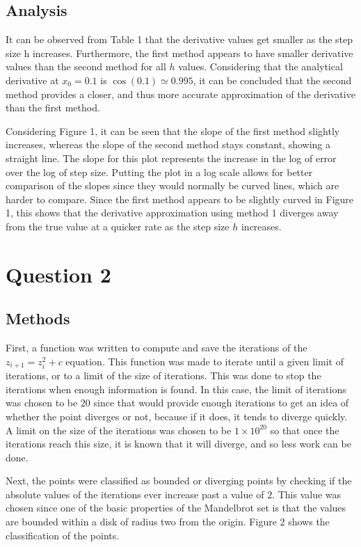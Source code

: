 \documentclass[12pt]{article}
\begin{document}
\subsection{Analysis}
It can be observed from Table 1 that the derivative values get smaller as the step size h increases. Furthermore, the first method appears to have smaller derivative values than the second method for all $h$ values. Considering that the analytical derivative at $x_0 = 0.1$ is $\cos(0.1) \simeq 0.995$, it can be concluded that the second method provides a closer, and thus more accurate approximation of the derivative than the first method.

Considering Figure 1, it can be seen that the slope of the first method slightly increases, whereas the slope of the second method stays constant, showing a straight line. The slope for this plot represents the increase in the log of error over the log of step size. Putting the plot in a log scale allows for better comparison of the slopes since they would normally be curved lines, which are harder to compare. Since the first method appears to be slightly curved in Figure 1, this shows that the derivative approximation using method 1 diverges away from the true value at a quicker rate as the step size $h$ increases.
\section{Question 2}
\subsection{Methods}
First, a function was written to compute and save the iterations of the $z_{i+1} = z_i^2 + c$ equation. This function was made to iterate until a given limit of iterations, or to a limit of the size of iterations. This was done to stop the iterations when enough information is found. In this case, the limit of iterations was chosen to be $20$ since that would provide enough iterations to get an idea of whether the point diverges or not, because if it does, it tends to diverge quickly. A limit on the size of the iterations was chosen to be $1 \times 10^{20}$ so that once the iterations reach this size, it is known that it will diverge, and so less work can be done.

Next, the points were classified as bounded or diverging points by checking if the absolute values of the iterations ever increase past a value of $2$. This value was chosen since one of the basic properties of the Mandelbrot set is that the values are bounded within a disk of radius two from the origin. Figure 2 shows the classification of the points.
\end{document}
